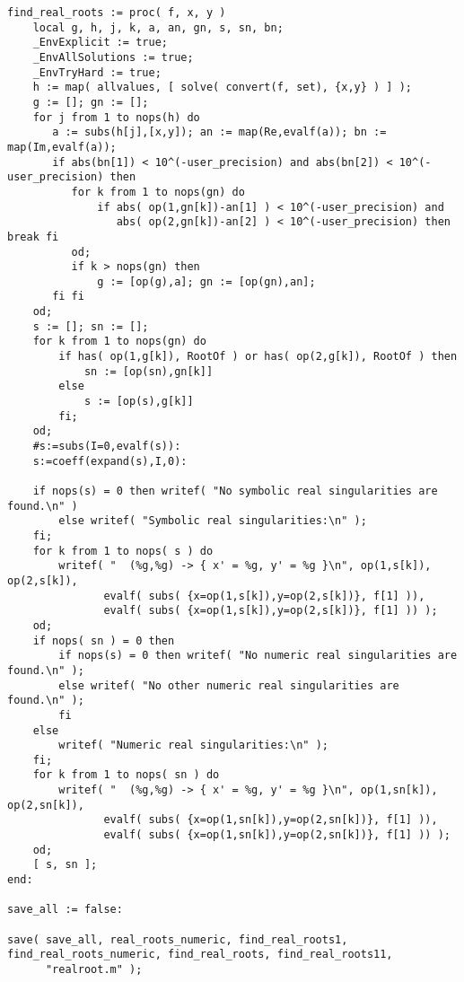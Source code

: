\documentclass[a4paper,10pt]{article}
\begin{document}
\begin{lstlisting}[name=realroot]
find_real_roots := proc( f, x, y )
    local g, h, j, k, a, an, gn, s, sn, bn;
    _EnvExplicit := true;
    _EnvAllSolutions := true;
    _EnvTryHard := true;
    h := map( allvalues, [ solve( convert(f, set), {x,y} ) ] );
    g := []; gn := [];
    for j from 1 to nops(h) do
       a := subs(h[j],[x,y]); an := map(Re,evalf(a)); bn := map(Im,evalf(a));
       if abs(bn[1]) < 10^(-user_precision) and abs(bn[2]) < 10^(-user_precision) then
          for k from 1 to nops(gn) do
              if abs( op(1,gn[k])-an[1] ) < 10^(-user_precision) and
                 abs( op(2,gn[k])-an[2] ) < 10^(-user_precision) then break fi
          od;
          if k > nops(gn) then
              g := [op(g),a]; gn := [op(gn),an];
       fi fi
    od;
    s := []; sn := [];
    for k from 1 to nops(gn) do
        if has( op(1,g[k]), RootOf ) or has( op(2,g[k]), RootOf ) then
            sn := [op(sn),gn[k]]
        else
            s := [op(s),g[k]]
        fi;
    od;
    #s:=subs(I=0,evalf(s)):
    s:=coeff(expand(s),I,0):

    if nops(s) = 0 then writef( "No symbolic real singularities are found.\n" )
        else writef( "Symbolic real singularities:\n" );
    fi;
    for k from 1 to nops( s ) do
        writef( "  (%g,%g) -> { x' = %g, y' = %g }\n", op(1,s[k]), op(2,s[k]),
               evalf( subs( {x=op(1,s[k]),y=op(2,s[k])}, f[1] )),
               evalf( subs( {x=op(1,s[k]),y=op(2,s[k])}, f[1] )) );
    od;
    if nops( sn ) = 0 then
        if nops(s) = 0 then writef( "No numeric real singularities are found.\n" );
        else writef( "No other numeric real singularities are found.\n" );
        fi
    else
        writef( "Numeric real singularities:\n" );
    fi;
    for k from 1 to nops( sn ) do
        writef( "  (%g,%g) -> { x' = %g, y' = %g }\n", op(1,sn[k]), op(2,sn[k]),
               evalf( subs( {x=op(1,sn[k]),y=op(2,sn[k])}, f[1] )),
               evalf( subs( {x=op(1,sn[k]),y=op(2,sn[k])}, f[1] )) );
    od;
    [ s, sn ];
end:

save_all := false:

save( save_all, real_roots_numeric, find_real_roots1, find_real_roots_numeric, find_real_roots, find_real_roots11,
      "realroot.m" );
\end{lstlisting}
\end{document}

